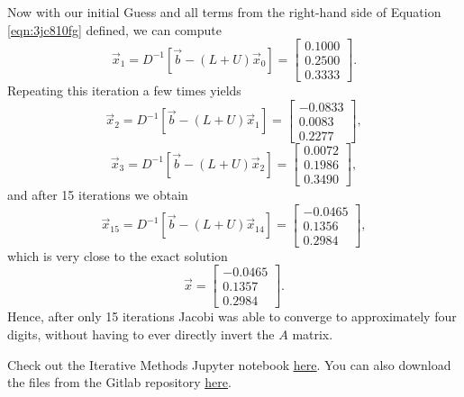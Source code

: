 Now with our initial Guess and all terms from the right-hand side of Equation \ref{eqn:3jc810fg} defined, we can compute
\begin{equation}
	\vec{x}_{1} = D^{-1}\left[ \vec{b} - (L+U)\vec{x}_0 \right] = \begin{bmatrix}
	    0.1000 \\
	    0.2500 \\
			0.3333
	\end{bmatrix}.
\end{equation}
Repeating this iteration a few times yields
\begin{equation}
	\vec{x}_{2} = D^{-1}\left[ \vec{b} - (L+U)\vec{x}_1 \right] = \begin{bmatrix}
	    -0.0833 \\
	    0.0083 \\
			0.2277
	\end{bmatrix},
\end{equation}
\begin{equation}
	\vec{x}_{3} = D^{-1}\left[ \vec{b} - (L+U)\vec{x}_2 \right] = \begin{bmatrix}
	    0.0072 \\
	    0.1986 \\
			0.3490
	\end{bmatrix},
\end{equation}
and after 15 iterations we obtain
\begin{equation}
	\vec{x}_{15} = D^{-1}\left[ \vec{b} - (L+U)\vec{x}_14 \right] = \begin{bmatrix}
	    -0.0465 \\
	    0.1356 \\
			0.2984
	\end{bmatrix},
\end{equation}
which is very close to the exact solution
\begin{equation}
	\vec{x} = \begin{bmatrix}
	    -0.0465 \\
	    0.1357 \\
			0.2984
	\end{bmatrix}.
\end{equation}
Hence, after only 15 iterations Jacobi was able to converge to approximately four digits, without having to ever directly invert the $A$ matrix.
\begin{jupyternote}
	Check out the Iterative Methods Jupyter notebook \href{\binderurl}{\underline{here}}. You can also download the files from the Gitlab repository \href{\repourl}{\underline{here}}.
\end{jupyternote}
